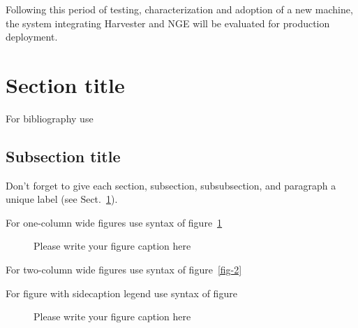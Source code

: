 \documentclass{webofc}
\begin{document}
Following this period of testing, characterization and adoption of a new machine, the system integrating Harvester and NGE will be evaluated for production deployment.




\section{Section title}
\label{sec-1}
For bibliography use \cite{RefJ}

\subsection{Subsection title}
\label{sec-2}
Don't forget to give each section, subsection, subsubsection, and
paragraph a unique label (see Sect.~\ref{sec-1}).

For one-column wide figures use syntax of figure~\ref{fig-1}
\begin{figure}[h]
\centering
\caption{Please write your figure caption here}
\label{fig-1}       %
\end{figure}

For two-column wide figures use syntax of figure~\ref{fig-2}
\begin{figure*}
\centering
\vspace*{5cm}       %
\caption{Please write your figure caption here}
\label{fig-2}       %
\end{figure*}

For figure with sidecaption legend use syntax of figure
\begin{figure}
\centering
\sidecaption
\caption{Please write your figure caption here}
\label{fig-3}       %
\end{figure}
\end{document}
